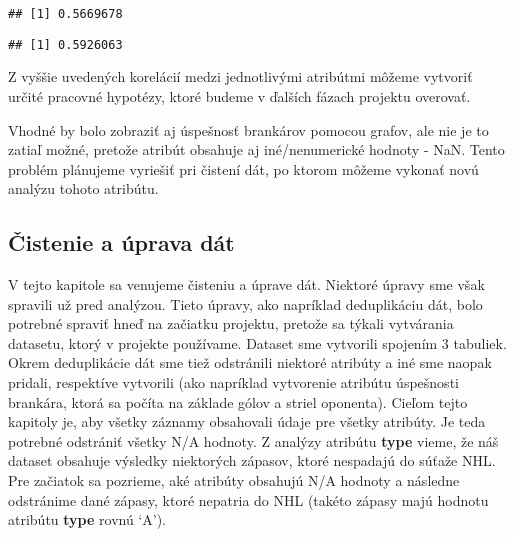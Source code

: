 \documentclass[
]{article}
\newenvironment{Shaded}{\begin{snugshade}}{\end{snugshade}}
\newcommand{\AttributeTok}[1]{\textcolor[rgb]{0.77,0.63,0.00}{#1}}
\newcommand{\FunctionTok}[1]{\textcolor[rgb]{0.00,0.00,0.00}{#1}}
\newcommand{\NormalTok}[1]{#1}
\newcommand{\SpecialCharTok}[1]{\textcolor[rgb]{0.00,0.00,0.00}{#1}}
\newcommand{\StringTok}[1]{\textcolor[rgb]{0.31,0.60,0.02}{#1}}
\begin{document}
\begin{Shaded}
\end{Shaded}

\begin{verbatim}
## [1] 0.5669678
\end{verbatim}

\begin{Shaded}
\end{Shaded}

\begin{verbatim}
## [1] 0.5926063
\end{verbatim}

Z vyššie uvedených korelácií medzi jednotlivými atribútmi môžeme
vytvoriť určité pracovné hypotézy, ktoré budeme v ďalších fázach
projektu overovať.

Vhodné by bolo zobraziť aj úspešnosť brankárov pomocou grafov, ale nie
je to zatiaľ možné, pretože atribút obsahuje aj iné/nenumerické hodnoty
- NaN. Tento problém plánujeme vyriešiť pri čistení dát, po ktorom
môžeme vykonať novú analýzu tohoto atribútu.

\hypertarget{ux10distenie-a-uxfaprava-duxe1t}{%
\subsection{Čistenie a úprava
dát}\label{ux10distenie-a-uxfaprava-duxe1t}}

V tejto kapitole sa venujeme čisteniu a úprave dát. Niektoré úpravy sme
však spravili už pred analýzou. Tieto úpravy, ako napríklad deduplikáciu
dát, bolo potrebné spraviť hneď na začiatku projektu, pretože sa týkali
vytvárania datasetu, ktorý v projekte používame. Dataset sme vytvorili
spojením 3 tabuliek. Okrem deduplikácie dát sme tiež odstránili niektoré
atribúty a iné sme naopak pridali, respektíve vytvorili (ako napríklad
vytvorenie atribútu úspešnosti brankára, ktorá sa počíta na základe
gólov a striel oponenta). Cieľom tejto kapitoly je, aby všetky záznamy
obsahovali údaje pre všetky atribúty. Je teda potrebné odstrániť všetky
N/A hodnoty. Z analýzy atribútu \textbf{type} vieme, že náš dataset
obsahuje výsledky niektorých zápasov, ktoré nespadajú do súťaže NHL. Pre
začiatok sa pozrieme, aké atribúty obsahujú N/A hodnoty a následne
odstránime dané zápasy, ktoré nepatria do NHL (takéto zápasy majú
hodnotu atribútu \textbf{type} rovnú `A').
\end{document}
